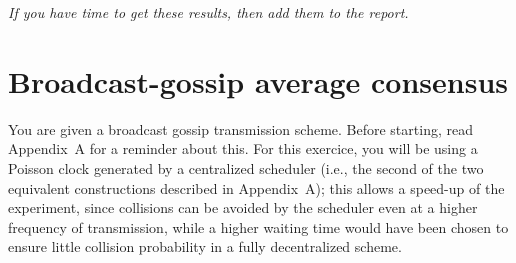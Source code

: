 \documentclass{article}
\begin{document}
\textit{\color{blue} If you have time to get these results, then add them to the report.}


%



\section{Broadcast-gossip average consensus}
You are given a broadcast gossip transmission scheme. Before starting, read Appendix~A for a reminder about this.
For this exercice, you will be using a Poisson clock generated by a centralized scheduler (i.e., the second of the two equivalent constructions described in Appendix~A); this allows a speed-up of the experiment, since collisions can be avoided by the scheduler even at a higher frequency of transmission, while a higher waiting time would have been chosen to ensure little collision probability in a fully decentralized scheme.\\
\end{document}
